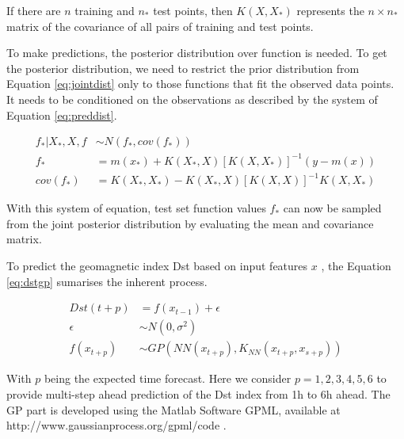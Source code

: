If there are  \( n \)  training and  \( n_{\ast} \)  test points, then  \( K \left( X,X_{\ast} \right)  \)  
represents the  \( n \times n_{\ast} \)  matrix of the covariance of all pairs of training and test points. 



To make predictions, the posterior distribution over function is needed. To get the posterior distribution, 
we need to restrict the prior distribution from Equation \ref{eq:jointdist} only to those functions that 
fit the observed data points. It needs to be conditioned on the observations as described by 
the system of Equation \ref{eq:preddist}.



\begin{align}\label{eq:preddist}
 f_{\ast} \vert X_{\ast},X,f &\sim N \left( f_{\ast},cov \left( f_{\ast} \right)  \right)  \\ 
 f_{\ast} &= m \left( x_{\ast} \right) +K \left( X_{\ast},X \right)  \left[ K \left( X,X_{\ast}  \right)  \right] ^{-1} \left( y-m \left( x \right)  \right) \\ 
 cov \left( f_{\ast} \right) &= K \left( X_{\ast},X_{\ast} \right) -K \left( X_{\ast},X \right)  \left[ K \left( X,X \right)  \right] ^{-1} K \left( X,X_{\ast} \right) 
\end{align}

With this system of equation, test set function values  \( f_{\ast} \)  can now be sampled from the joint 
posterior distribution by evaluating the mean and covariance matrix. 



To predict the geomagnetic index Dst based on input features \( x \) , the Equation \ref{eq:dstgp} sumarises 
the inherent process. 



\begin{align}\label{eq:dstgp}
Dst \left( t+p \right) &= f \left( x_{t-1} \right) + \epsilon \\ 
\epsilon &\sim N \left( 0, \sigma ^{2} \right)  \\
f \left( x_{t+p} \right)  &\sim GP \left( NN \left( x_{t+p} \right) , K_{NN}(x_{t+p}, x_{s+p} ) \right)
\end{align}

With  \( p \)  being the expected time forecast. Here we 
consider $p  = {1,2,3,4,5,6}$ to provide multi-step ahead prediction 
of the Dst index from 1h to 6h ahead. The GP part is developed using the Matlab Software GPML, available 
at http://www.gaussianprocess.org/gpml/code \citet{rasmussen2010gaussian}.




